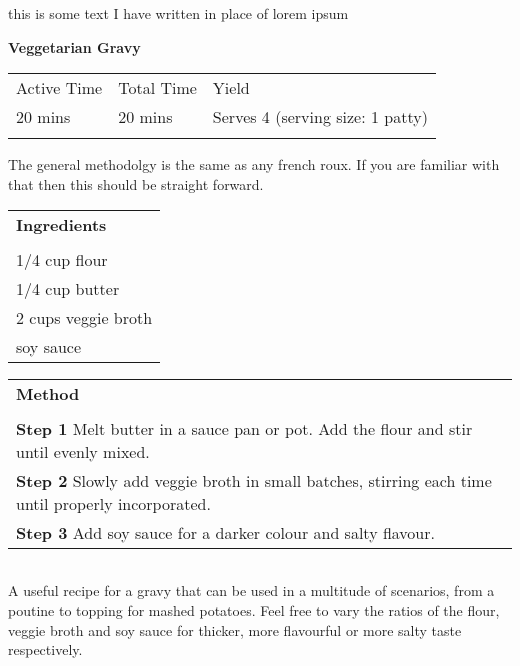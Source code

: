 \documentclass[11pt]{article}
\begin{document}
\vspace{3em}
\begin{tabular}[b]{ p{3cm} }
  \hline
\end{tabular}
this is some text I have written in place of lorem ipsum

\newpage

{\Huge \textbf{Veggetarian Gravy}\par}
\vspace{1em}
\begin{tabular}{@{}l l l}
  \hline
  \noalign{\smallskip}
  Active Time & Total Time & Yield \\
  20 mins & 20 mins & Serves 4 (serving size: 1 patty) \\
  \noalign{\smallskip}
  \hline
\end{tabular}

\vspace{2em}
The general methodolgy is the same as any french roux. If you are familiar with that then this should be straight forward.
\vspace{2em}

\begin{tabular}[t]{ p{5cm} }
  \textbf{Ingredients} \\
  \\
  1/4 cup flour \\
  1/4 cup butter \\
  2 cups veggie broth \\
  soy sauce \\
\end{tabular}
\begin{tabular}[t]{ p{10cm} }
  \textbf{Method} \\
  \\
  \textbf{Step 1} \hspace{3mm} Melt butter in a sauce pan or pot. Add the flour and stir until evenly mixed. \\[5mm]
  \textbf{Step 2} \hspace{3mm} Slowly add veggie broth in small batches, stirring each time until properly incorporated. \\[5mm]
  \textbf{Step 3} \hspace{3mm} Add soy sauce for a darker colour and salty flavour.  \\
\end{tabular}

\vspace{3em}
\begin{tabular}[b]{ p{3cm} }
  \hline
\end{tabular}
A useful recipe for a gravy that can be used in a multitude of scenarios, from a poutine to topping for mashed potatoes. Feel free to vary the ratios of the flour, veggie broth and soy sauce for thicker, more flavourful or more salty taste respectively. 

\end{document}
